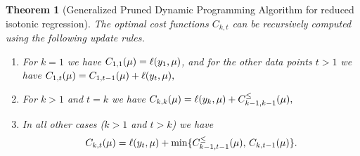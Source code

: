 \documentclass[aoas]{imsart}
\newtheorem{theorem}{Theorem}
\begin{document}
\begin{theorem}[Generalized Pruned Dynamic Programming Algorithm
  for reduced isotonic regression]
\label{thm:gpdpa}
  The optimal cost functions $C_{k,t}$ can be recursively computed
  using the following update rules.
\begin{enumerate}
\item For $k=1$ we have
$C_{1,1}(\mu)=\ell(y_1,\mu)$, and for the other data
  points $t>1$ we have
$
C_{1,t}(\mu)=C_{1,t-1}(\mu)+\ell(y_t,\mu),
$
\item For $k>1$ and $t=k$ we have
$
  C_{k,k}(\mu)=\ell(y_k, \mu)+C_{k-1,k-1}^\leq(\mu),
$
\item In all other cases ($k>1$ and $t>k$) we have
 $$
  C_{k,t}(\mu)=\ell(y_t,\mu)+
  \min\{
  C_{k-1,t-1}^\leq(\mu),\,
  C_{k,t-1}(\mu)
  \}.
$$
\end{enumerate}
\end{theorem}
\end{document}
